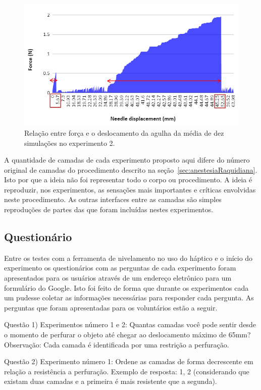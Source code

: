 \begin{figure}[ht!]
    \centering
    \includegraphics[width=0.8\linewidth]{capitulos/figuras/Experiment 2 - Force x Needle displacement - marked.PNG} 
    \caption{Relação entre força e o deslocamento da agulha da média de dez simulações no experimento 2.}
    \label{fig:forcaDeslocamentoExperimento2}
\end{figure}

A quantidade de camadas de cada experimento proposto aqui difere do número original de camadas do procedimento descrito na seção~\ref{sec:anestesiaRaquidiana}. Isto por que a ideia não foi representar todo o corpo ou procedimento. A ideia é reproduzir, nos experimentos, as sensações mais importantes e críticas envolvidas neste procedimento. As outras interfaces entre as camadas são simples reproduções de partes das que foram incluídas nestes experimentos.

\subsection{Questionário}
\label{sec:questionario}

Entre os testes com a ferramenta de nivelamento no uso do háptico e o início do experimento os questionários com as perguntas de cada experimento foram apresentados para os usuários através de um endereço eletrônico para um formulário do Google. Isto foi feito de forma que durante os experimentos cada um pudesse coletar as informações necessárias para responder cada pergunta. As perguntas que foram apresentadas para os voluntários estão a seguir.

Questão 1) Experimentos número 1 e 2: Quantas camadas você pode sentir desde o momento de perfurar o objeto até chegar ao deslocamento máximo de 65mm? 
Observação: Cada camada é identificada por uma restrição a perfuração.

Questão 2) Experimento número 1: Ordene as camadas de forma decrescente em relação a resistência a perfuração.    
Exemplo de resposta: 1, 2 (considerando que existam duas camadas e a primeira é mais resistente que a segunda).

